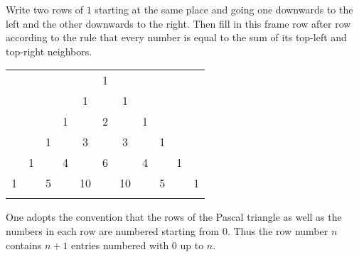 

\setcounter{section}{3}
\setcounter{subsection}{3}
\setcounter{dfn}{4}

Write two rows of $1$ starting at the same place and going one downwards to the left and the other downwards to the right.
Then fill in this frame row after row according to the rule that every number is equal to the sum
of its top-left and top-right neighbors.

\begin{center}
\begin{tabular}{ccccccccccc}
&    &    &    &    &  1\\\noalign{\smallskip\smallskip}
&    &    &    &  1 &    &  1\\\noalign{\smallskip\smallskip}
&    &    &  1 &    &  2 &    &  1\\\noalign{\smallskip\smallskip}
&    &  1 &    &  3 &    &  3 &    &  1\\\noalign{\smallskip\smallskip}
&  1 &    &  4 &    &  6 &    &  4 &    & 1\\\noalign{\smallskip\smallskip}
1&   &  5 &    & 10 &    & 10 &    &  5 &   & 1\\\noalign{\smallskip\smallskip}
\end{tabular}
\end{center}

One adopts the convention that the rows of the Pascal triangle as well as the numbers in each row are numbered starting from $0$.
Thus the row number $n$ contains $n+1$ entries numbered with $0$ up to $n$.



